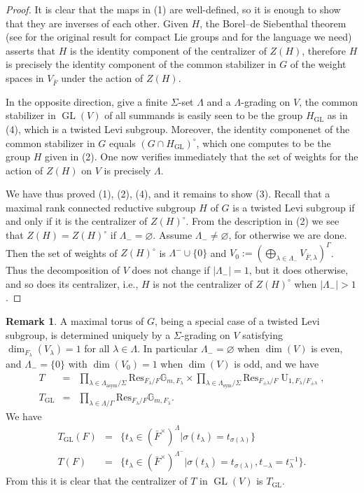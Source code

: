 \documentclass{article}
\def\mb#1{\mathbb{#1}}
\def\tx#1{\textrm{#1}}
\DeclareMathOperator{\GL}{GL}
\theoremstyle{definition}
\newtheorem{rem}[thm]{Remark}
\numberwithin{equation}{subsection}
\renewcommand{\-}{\hyp{}}
\DeclareMathOperator{\U}{U}
\begin{document}
\begin{proof}
	It is clear that the maps in (1) are well-defined, so it is enough to show that they are inverses of each other. Given $H$, the Borel--de Siebenthal theorem (see \cite{BdS1949} for the original result for compact Lie groups and \cite[Proposition 1.1]{SPL2015} for the language we need) asserts that $H$ is the identity component of the centralizer of $Z(H)$, therefore $H$ is precisely the identity component of the common stabilizer in $G$ of the weight spaces in $V_{\bar F}$ under the action of $Z(H)$.

	In the opposite direction, give a finite $\Sigma$-set $\Lambda$ and a $\Lambda$-grading on $V$, the common stabilizer in $\GL(V)$ of all summands is easily seen to be the group $H_{\GL}$ as in (4), which is a twisted Levi subgroup. Moreover, the identity componenet of the common stabilizer in $G$ equals $(G \cap H_{\GL})^\circ$, which one computes to be the group $H$ given in (2). One now verifies immediately that the set of weights for the action of $Z(H)$ on $V$ is precisely $\Lambda$.

	We have thus proved (1), (2), (4), and it remains to show (3). Recall that a maximal rank connected reductive subgroup $H$ of $G$ is a twisted Levi subgroup if and only if it is the centralizer of $Z(H)^\circ$. From the description in (2) we see that $Z(H) = Z(H)^\circ$ if $\Lambda_- = \varnothing$. Assume $\Lambda_- \neq \varnothing$, for otherwise we are done. Then the set of weights of $Z(H)^\circ$ is $\Lambda^- \cup \{0\}$ and $V_0 := (\bigoplus_{\lambda \in \Lambda_-} V_{\bar F,\lambda})^\Gamma$. Thus the decomposition of $V$ does not change if $|\Lambda_-|=1$, but it does otherwise, and so does its centralizer, i.e., $H$ is not the centralizer of $Z(H)^\circ$ when $|\Lambda_-|>1$.
\end{proof}

\begin{rem}\label{rem:torussigmaset}
	A maximal torus of $G$, being a special case of a twisted Levi subgroup, is determined uniquely by a $\Sigma$-grading on $V$ satisfying $\dim_{F_\lambda}(V_\lambda)=1$ for all $\lambda \in \Lambda$. In particular $\Lambda_-=\varnothing$ when $\dim(V)$ is even, and $\Lambda_-=\{0\}$ with $\dim(V_0)=1$ when $\dim(V)$ is odd, and we have
		\begin{eqnarray*}
		T&=&\prod_{\lambda \in \Lambda_\tx{asym}/\Sigma} \tx{Res}_{F_\lambda/F}\mb{G}_{m,F_\lambda} \times \prod_{\lambda \in \Lambda_\tx{sym}/\Sigma} \tx{Res}_{F_{\pm\lambda}/F}\U_{1,F_\lambda/F_{\pm\lambda}},\\
		T_{\GL}&=&\prod_{\lambda \in \Lambda/\Gamma} \tx{Res}_{F_\lambda/F}\mb{G}_{m,F_\lambda}.
		\end{eqnarray*}
		We have 
		\begin{eqnarray*}
			T_{\GL}(F)&=&\{t_\lambda \in (\bar F^\times)^\Lambda|\sigma(t_\lambda)=t_{\sigma(\lambda)} \}\\
			T(F)&=&\{t_\lambda \in (\bar F^\times)^{\Lambda^-}|\sigma(t_\lambda)=t_{\sigma(\lambda)},t_{-\lambda}=t_\lambda^{-1} \}.
		\end{eqnarray*}
		From this it is clear that the centralizer of $T$ in $\GL(V)$ is $T_{\GL}$.
\end{rem}
\end{document}
